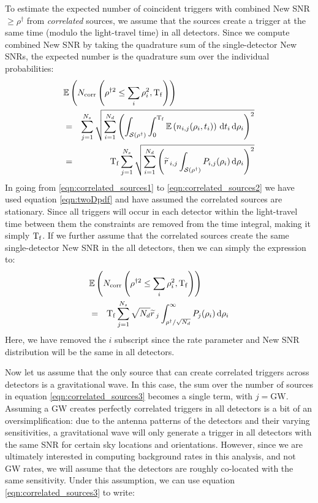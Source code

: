 To estimate the expected number of coincident triggers with combined New \ac{SNR} $\geq \rho^\dagger$ from \emph{correlated} sources, we assume that the sources create a trigger at the same time (modulo the light-travel time) in all detectors. Since we compute combined New \ac{SNR} by taking the quadrature sum of the single-detector New \acp{SNR}, the expected number is the quadrature sum over the individual probabilities:
\begin{eqnarray}
\label{eqn:correlated_sources1}
\lefteqn{\Exptd\left(N_{\mathrm{corr}} \left( \rho^{\dagger2} \leq \sum_i\rho_i^2, \Tf \right) \right) } \nonumber \\
 & = & \sum_{j=1}^{N_s} \sqrt{ \sum_{i=1}^{N_d} \left( \int_{\mathcal{S}(\rho^\dagger)} \int_{0}^{\Tf} \Exptd\left(n_{i,j}(\rho_i,t_i)\right)\d t_i \d \rho_i \right)^2 } \\
\label{eqn:correlated_sources2}
 & = & \Tf \sum_{j=1}^{N_s} \sqrt{ \sum_{i=1}^{N_d} \left( \rsrc_{i,j} \int_{\mathcal{S}(\rho^\dagger)} P_{i,j}(\rho_i) \d \rho_i \right)^2 }
\end{eqnarray}
In going from \ref{eqn:correlated_sources1} to \ref{eqn:correlated_sources2} we have used equation \ref{eqn:twoDpdf} and have assumed the correlated sources are stationary. Since all triggers will occur in each detector within the light-travel time between them the constraints are removed from the time integral, making it simply $\mathrm{T_f}$. If we further assume that the correlated sources create the same single-detector New \ac{SNR} in the all detectors, then we can simply the expression to:
\begin{eqnarray}
\label{eqn:correlated_sources3}
\lefteqn{\Exptd\left(N_{\mathrm{corr}} \left( \rho^{\dagger2} \leq \sum_i\rho_i^2, \Tf \right) \right) } \nonumber \\
  & = & \Tf \sum_{j=1}^{N_s} \sqrt{N_d} \rsrc_{j} \int_{\rho^\dagger/\sqrt{N_d}}^\infty P_{j}(\rho_i) \d \rho_i
\end{eqnarray}
Here, we have removed the $i$ subscript since the rate parameter and New \ac{SNR} distribution will be the same in all detectors.

Now let us assume that the only source that can create correlated triggers across detectors is a gravitational wave. In this case, the sum over the number of sources in equation \ref{eqn:correlated_sources3} becomes a single term, with $j = \mathrm{GW}$. Assuming a \ac{GW} creates perfectly correlated triggers in all detectors is a bit of an oversimplification: due to the antenna patterns of the detectors and their varying sensitivities, a gravitational wave will only generate a trigger in all detectors with the same \ac{SNR} for certain sky locations and orientations. However, since we are ultimately interested in computing background rates in this analysis, and not \ac{GW} rates, we will assume that the detectors are roughly co-located with the same sensitivity. Under this assumption, we can use equation \ref{eqn:correlated_sources3} to write:

